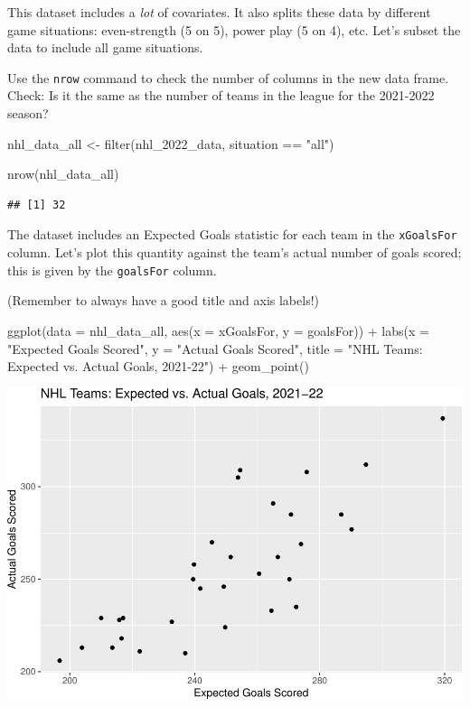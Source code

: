 \documentclass[
  11pt,
]{book}
\newenvironment{Shaded}{\begin{snugshade}}{\end{snugshade}}
\newcommand{\AttributeTok}[1]{\textcolor[rgb]{0.77,0.63,0.00}{#1}}
\newcommand{\FunctionTok}[1]{\textcolor[rgb]{0.00,0.00,0.00}{#1}}
\newcommand{\NormalTok}[1]{#1}
\newcommand{\OtherTok}[1]{\textcolor[rgb]{0.56,0.35,0.01}{#1}}
\newcommand{\SpecialCharTok}[1]{\textcolor[rgb]{0.00,0.00,0.00}{#1}}
\newcommand{\StringTok}[1]{\textcolor[rgb]{0.31,0.60,0.02}{#1}}
\theoremstyle{definition}
\theoremstyle{definition}
\theoremstyle{definition}
\theoremstyle{definition}
\theoremstyle{remark}
\begin{document}
This dataset includes a \emph{lot} of covariates. It also splits these data by different game situations: even-strength (5 on 5), power play (5 on 4), etc. Let's subset the data to include all game situations.

Use the \texttt{nrow} command to check the number of columns in the new data frame. Check: Is it the same as the number of teams in the league for the 2021-2022 season?

\begin{Shaded}
\begin{Highlighting}[]
\NormalTok{nhl\_data\_all }\OtherTok{\textless{}{-}} \FunctionTok{filter}\NormalTok{(nhl\_2022\_data, situation }\SpecialCharTok{==} \StringTok{"all"}\NormalTok{)}

\FunctionTok{nrow}\NormalTok{(nhl\_data\_all)}
\end{Highlighting}
\end{Shaded}

\begin{verbatim}
## [1] 32
\end{verbatim}

The dataset includes an Expected Goals statistic for each team in the \texttt{xGoalsFor} column. Let's plot this quantity against the team's actual number of goals scored; this is given by the \texttt{goalsFor} column.

(Remember to always have a good title and axis labels!)

\begin{Shaded}
\begin{Highlighting}[]
\FunctionTok{ggplot}\NormalTok{(}\AttributeTok{data =}\NormalTok{ nhl\_data\_all, }\FunctionTok{aes}\NormalTok{(}\AttributeTok{x =}\NormalTok{ xGoalsFor, }\AttributeTok{y =}\NormalTok{ goalsFor)) }\SpecialCharTok{+} \FunctionTok{labs}\NormalTok{(}\AttributeTok{x =} \StringTok{"Expected Goals Scored"}\NormalTok{,}
    \AttributeTok{y =} \StringTok{"Actual Goals Scored"}\NormalTok{, }\AttributeTok{title =} \StringTok{"NHL Teams: Expected vs. Actual Goals, 2021{-}22"}\NormalTok{) }\SpecialCharTok{+}
    \FunctionTok{geom\_point}\NormalTok{()}
\end{Highlighting}
\end{Shaded}

\includegraphics{series_files/figure-latex/unnamed-chunk-25-1.pdf}
\end{document}
